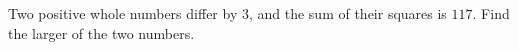 Two positive whole numbers differ by $3$, and the sum of their squares is $117$. Find the larger of the two numbers.
